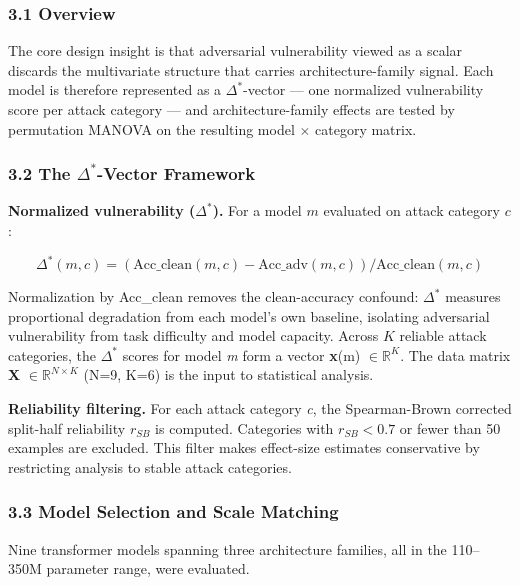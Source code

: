 
\subsubsection{3.1 Overview}

The core design insight is that adversarial vulnerability viewed as a scalar discards the multivariate structure that carries architecture-family signal. Each model is therefore represented as a $\Delta^*$-vector --- one normalized vulnerability score per attack category --- and architecture-family effects are tested by permutation MANOVA on the resulting model $\times$ category matrix.

\subsubsection{3.2 The $\Delta^*$-Vector Framework}

\textbf{Normalized vulnerability ($\Delta^*$).} For a model $m$ evaluated on attack category $c$:

\[ \Delta^*(m, c) = (\text{Acc\_clean}(m, c) - \text{Acc\_adv}(m, c)) / \text{Acc\_clean}(m, c) \]

Normalization by Acc\_clean removes the clean-accuracy confound: $\Delta^*$ measures proportional degradation from each model's own baseline, isolating adversarial vulnerability from task difficulty and model capacity. Across $K$ reliable attack categories, the $\Delta^*$ scores for model \textit{m} form a vector \textbf{x}(m) $\in \mathbb{R}^K$. The data matrix \textbf{X} $\in \mathbb{R}^{N\times K}$ (N=9, K=6) is the input to statistical analysis.

\textbf{Reliability filtering.} For each attack category \textit{c}, the Spearman-Brown corrected split-half reliability $r_{SB}$ is computed. Categories with $r_{SB} < 0.7$ or fewer than 50 examples are excluded. This filter makes effect-size estimates conservative by restricting analysis to stable attack categories.

\subsubsection{3.3 Model Selection and Scale Matching}

Nine transformer models spanning three architecture families, all in the 110--350M parameter range, were evaluated.

\begin{table}[htbp]
\centering
{}
\end{table}

